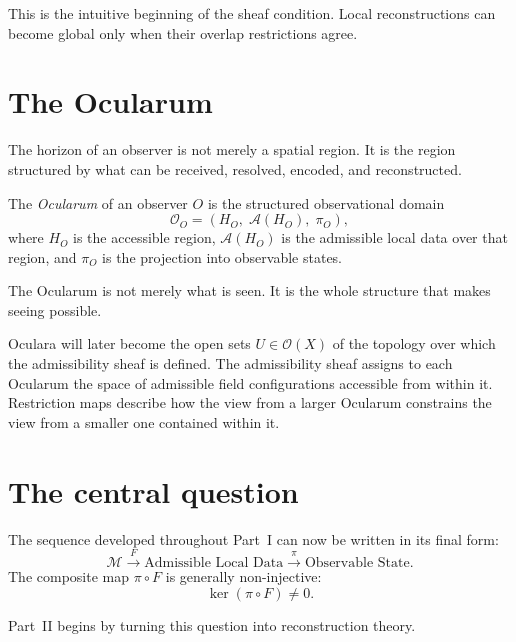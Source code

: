 This is the intuitive beginning of the sheaf condition.
Local reconstructions can become global only when their
overlap restrictions agree.

\section{The Ocularum}

The horizon of an observer is not merely a spatial region.
It is the region structured by what can be received,
resolved, encoded, and reconstructed.

\begin{definition}[Ocularum]
  The \emph{Ocularum} of an observer $O$ is the structured
  observational domain
  \[
    \mathcal{O}_O = (H_O,\; \mathcal{A}(H_O),\; \pi_O),
  \]
  where $H_O$ is the accessible region, $\mathcal{A}(H_O)$
  is the admissible local data over that region, and $\pi_O$
  is the projection into observable states.
\end{definition}

The Ocularum is not merely what is seen.
It is the whole structure that makes seeing possible.

\begin{TechNote}
  Oculara will later become the open sets $U \in \mathcal{O}(X)$
  of the topology over which the admissibility sheaf is defined.
  The admissibility sheaf assigns to each Ocularum the space
  of admissible field configurations accessible from within it.
  Restriction maps describe how the view from a larger Ocularum
  constrains the view from a smaller one contained within it.
\end{TechNote}

\section{The central question}

The sequence developed throughout Part~I can now be written
in its final form:
\[
  \mathcal{M}
  \xrightarrow{F}
  \text{Admissible Local Data}
  \xrightarrow{\pi}
  \text{Observable State}.
\]
The composite map $\pi \circ F$ is generally non-injective:
\[
  \ker(\pi \circ F) \neq 0.
\]


Part~II begins by turning this question into reconstruction
theory.

